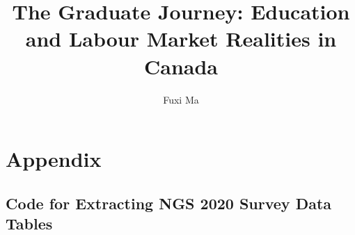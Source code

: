 \documentclass[
  11pt,
  a4paper,
]{article}
\title{The Graduate Journey: Education and Labour Market Realities in
Canada}
\author{Fuxi Ma}
\date{}
\renewcommand*\contentsname{Table of contents}
\newcommand\contentsname{Table of contents}
\begin{document}
\maketitle

\renewcommand*\contentsname{Table of contents}
{
\hypersetup{linkcolor=}
\setcounter{tocdepth}{5}
\tableofcontents
}

\section{Appendix}\label{appendix}

\subsection{Code for Extracting NGS 2020 Survey Data
Tables}\label{code-for-extracting-ngs-2020-survey-data-tables}
\end{document}
